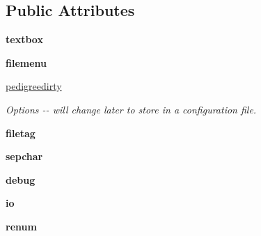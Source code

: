 \subsection*{Public Attributes}
\begin{DoxyCompactItemize}
\item 
\hypertarget{classPyPedal_1_1pyp__gui_1_1MainWindow_ab7e15bf9be118ceab05175c4d15fef61}{
{\bfseries textbox}}
\label{classPyPedal_1_1pyp__gui_1_1MainWindow_ab7e15bf9be118ceab05175c4d15fef61}

\item 
\hypertarget{classPyPedal_1_1pyp__gui_1_1MainWindow_a2f73d91fe5a5a9c4edd35db03ae6950f}{
{\bfseries filemenu}}
\label{classPyPedal_1_1pyp__gui_1_1MainWindow_a2f73d91fe5a5a9c4edd35db03ae6950f}

\item 
\hypertarget{classPyPedal_1_1pyp__gui_1_1MainWindow_a08d3ee0be8faffc2253d417486a6ff1e}{
\hyperlink{classPyPedal_1_1pyp__gui_1_1MainWindow_a08d3ee0be8faffc2253d417486a6ff1e}{pedigreedirty}}
\label{classPyPedal_1_1pyp__gui_1_1MainWindow_a08d3ee0be8faffc2253d417486a6ff1e}

\begin{DoxyCompactList}\small\item\em Options -\/-\/ will change later to store in a configuration file. \end{DoxyCompactList}\item 
\hypertarget{classPyPedal_1_1pyp__gui_1_1MainWindow_a42aab73a915ad7eda8eea97fd7c2251f}{
{\bfseries filetag}}
\label{classPyPedal_1_1pyp__gui_1_1MainWindow_a42aab73a915ad7eda8eea97fd7c2251f}

\item 
\hypertarget{classPyPedal_1_1pyp__gui_1_1MainWindow_a55c8e8205fb6b43ad7a19c3845123d95}{
{\bfseries sepchar}}
\label{classPyPedal_1_1pyp__gui_1_1MainWindow_a55c8e8205fb6b43ad7a19c3845123d95}

\item 
\hypertarget{classPyPedal_1_1pyp__gui_1_1MainWindow_ac39ba8bfc3a08a553e38bfb54a53699e}{
{\bfseries debug}}
\label{classPyPedal_1_1pyp__gui_1_1MainWindow_ac39ba8bfc3a08a553e38bfb54a53699e}

\item 
\hypertarget{classPyPedal_1_1pyp__gui_1_1MainWindow_a8f7b5201ec94cca426ff6c7f9ce9b5f2}{
{\bfseries io}}
\label{classPyPedal_1_1pyp__gui_1_1MainWindow_a8f7b5201ec94cca426ff6c7f9ce9b5f2}

\item 
\hypertarget{classPyPedal_1_1pyp__gui_1_1MainWindow_ae22b6aec038caf875e0271c733df5000}{
{\bfseries renum}}
\label{classPyPedal_1_1pyp__gui_1_1MainWindow_ae22b6aec038caf875e0271c733df5000}


\end{DoxyCompactItemize}
